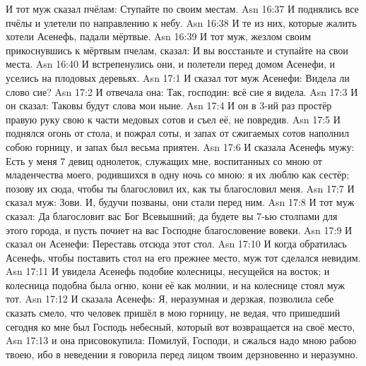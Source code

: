 И тот муж сказал пчёлам:
Ступайте по своим местам.
\vs Asn 16:37
И поднялись все пчёлы и
улетели по направлению к небу.
\vs Asn 16:38
И те из них, которые жалить
хотели Асенефь, падали мёртвые.
\vs Asn 16:39
И тот муж, жезлом своим
прикоснувшись к мёртвым пчелам, сказал:
И вы восстаньте и ступайте на свои места.
\vs Asn 16:40
И встрепенулись они, и
полетели перед домом Асенефи,
и уселись на плодовых деревьях.
\vs Asn 17:1
И сказал тот муж Асенефи:
Видела ли слово сие?
\vs Asn 17:2
И отвечала она: Так, господин: всё сие я видела.
\vs Asn 17:3
И он сказал: Таковы будут слова мои ныне.
\vs Asn 17:4
И он в 3-ий раз простёр правую руку свою
к части медовых сотов и съел её, не повредив.
\vs Asn 17:5
И поднялся огонь от стола, и пожрал соты,
и запах от сжигаемых сотов наполнил собою горницу,
и запах был весьма приятен.
\vs Asn 17:6
И сказала Асенефь мужу:
Есть у меня 7 девиц однолеток, служащих мне, воспитанных со мною от
младенчества моего, родившихся в одну ночь со мною: я их люблю как сестёр;
позову их сюда, чтобы ты благословил их, как ты благословил меня.
\vs Asn 17:7
И сказал муж: Зови.
И, будучи позваны, они стали перед ним.
\vs Asn 17:8
И тот муж сказал:
Да благословит вас Бог Всевышний;
да будете вы 7-ью столпами для этого города,
и пусть почиет на вас Господне благословение вовеки.
\vs Asn 17:9
И сказал он Асенефи:
Переставь отсюда этот стол.
\vs Asn 17:10
И когда обратилась Асенефь,
чтобы поставить стол на его прежнее место,
муж тот сделался невидим.
\vs Asn 17:11
И увидела Асенефь подобие
колесницы, несущейся на восток; и колесница подобна была огню, кони её как
молнии, и на колеснице стоял муж тот.
\vs Asn 17:12
И сказала Асенефь:
Я, неразумная и дерзкая, позволила себе сказать смело,
что человек пришёл в мою горницу, не ведая,
что пришедший сегодня ко мне был
Господь небесный, который вот возвращается на своё место,
\vs Asn 17:13
и она присовокупила:
Помилуй, Господи, и сжалься надо мною рабою твоею, ибо в неведении я говорила
перед лицом твоим дерзновенно и неразумно.

